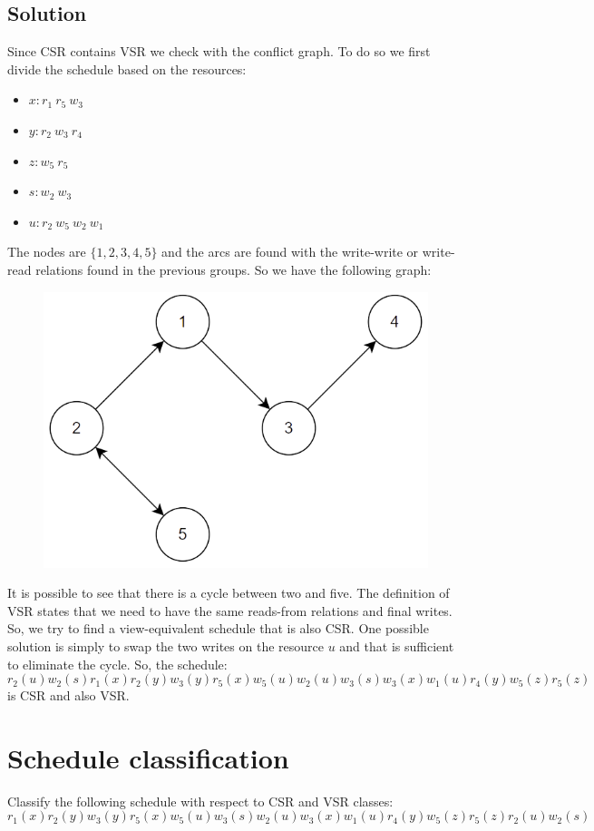 \documentclass[12pt, a4paper]{report}
\begin{document}
    \subsection*{Solution}
        Since CSR contains VSR we check with the conflict graph. To do so we first divide the schedule based on the resources: 
        \begin{itemize}
            \item $x: r_1 \: r_5 \:w_3$
            \item $y: r_2 \: w_3 \:r_4$
            \item $z: w_5 \: r_5$
            \item $s: w_2 \: w_3$
            \item $u: r_2 \: w_5 \: w_2 \:w_1$
        \end{itemize}
        The nodes are $\{1,2,3,4,5\}$ and the arcs are found with the write-write or write-read relations found in the previous groups. So we have the following graph:
        \begin{figure}[H]
            \centering
            \includegraphics[width=0.5\linewidth]{images/conflictgraph1.png}
        \end{figure}
        It is possible to see that there is a cycle between two and five. The definition of VSR states that we need to have the same reads-from relations and final writes. So, we try to find a view-equivalent 
        schedule that is also CSR. One possible solution is simply to swap the two writes on the resource $u$ and that is sufficient to eliminate the cycle. So, the schedule: 
        \[r_2(u) w_2(s) r_1(x) r_2(y) w_3(y) r_5(x) w_5(u) w_2(u) w_3(s) w_3(x) w_1(u) r_4(y) w_5(z) r_5(z)\]
        is CSR and also VSR. 

    \newpage
    
    \section{Schedule classification}
        Classify the following schedule with respect to CSR and VSR classes:  
        \[r_1(x) r_2(y) w_3(y) r_5(x) w_5(u) w_3(s)w_2(u) w_3(x) w_1(u) r_4(y) w_5(z) r_5(z) r_2(u) w_2(s)\]
\end{document}
